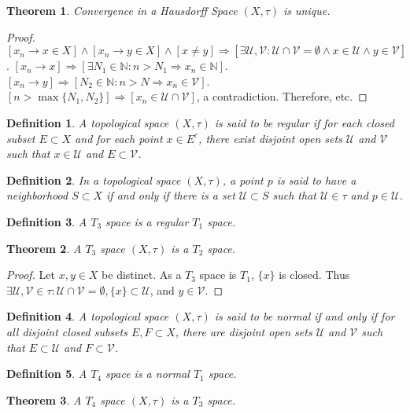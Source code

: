 \documentclass[crop=false,class=book]{standalone}
\theoremstyle{mystyle}
\newtheorem{theorem}{Theorem}[section]
\newtheorem{definition}{Definition}[section]
\begin{document}
\begin{theorem}
Convergence in a Hausdorff Space $(X,\tau)$ is unique.
\end{theorem}
\begin{proof}
$[x_n \rightarrow x\in X]\land [x_n \rightarrow y\in X]\land[x\ne y]\Rightarrow [\exists \mathcal{U},\mathcal{V}:\mathcal{U}\cap \mathcal{V}=\emptyset\land x\in \mathcal{U}\land y\in \mathcal{V}]$. $[x_n\rightarrow x]\Rightarrow [\exists N_1\in \mathbb{N}:n>N_1\Rightarrow x_n \in \mathbb{N}]$. $[x_n\rightarrow y]\Rightarrow [N_2\in \mathbb{N}:n>N\Rightarrow x_n \in \mathcal{V}]$. $[n>\max\{N_1,N_2\}]\Rightarrow [x_n \in \mathcal{U}\cap \mathcal{V}]$, a contradiction. Therefore, etc.
\end{proof}
\begin{definition}
A topological space $(X,\tau)$ is said to be regular if for each closed subset $E\subset X$ and for each point $x\in E^c$, there exist disjoint open sets $\mathcal{U}$ and $\mathcal{V}$ such that $x\in \mathcal{U}$ and $E\subset \mathcal{V}$.
\end{definition} 
\begin{definition}
In a topological space $(X,\tau)$, a point $p$ is said to have a neighborhood $S\subset X$ if and only if there is a set $\mathcal{U}\subset S$ such that $\mathcal{U}\in \tau$ and $p\in \mathcal{U}$.
\end{definition}
\begin{definition}
A $T_3$ space is a regular $T_1$ space.
\end{definition}
\begin{theorem}
A $T_3$ space $(X,\tau)$ is a $T_2$ space.
\end{theorem}
\begin{proof}
Let $x,y\in X$ be distinct. As a $T_3$ space is $T_1$, $\{x\}$ is closed. Thus $\exists \mathcal{U},\mathcal{V}\in\tau: \mathcal{U}\cap\mathcal{V}=\emptyset, \{x\}\subset \mathcal{U}$, and $y\in \mathcal{V}$.
\end{proof}
\begin{definition}
A topological space $(X,\tau)$ is said to be normal if and only if for all disjoint closed subsets $E,F\subset X$, there are disjoint open sets $\mathcal{U}$ and $\mathcal{V}$ such that $E\subset \mathcal{U}$ and $F\subset \mathcal{V}$.
\end{definition}
\begin{definition}
A $T_4$ space is a normal $T_1$ space.
\end{definition}
\begin{theorem}
A $T_4$ space $(X,\tau)$ is a $T_3$ space.
\end{theorem}
\end{document}
